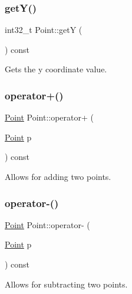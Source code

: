 \subsubsection{\texorpdfstring{getY()}{getY()}}
{\footnotesize\ttfamily int32\+\_\+t Point\+::getY (\begin{DoxyParamCaption}{ }\end{DoxyParamCaption}) const\hspace{0.3cm}{\ttfamily [inline]}}



Gets the y coordinate value. 

\mbox{\label{struct_point_a8629d3083ed756bbf84fbbd7f4b0781a}} 
\subsubsection{\texorpdfstring{operator+()}{operator+()}}
{\footnotesize\ttfamily \mbox{\hyperlink{struct_point}{Point}} Point\+::operator+ (\begin{DoxyParamCaption}\item[{\mbox{\hyperlink{struct_point}{Point}}}]{p }\end{DoxyParamCaption}) const\hspace{0.3cm}{\ttfamily [inline]}}



Allows for adding two points. 

\mbox{\label{struct_point_a21c4b2d6af14c97a276931a912413bef}} 
\subsubsection{\texorpdfstring{operator-\/()}{operator-()}}
{\footnotesize\ttfamily \mbox{\hyperlink{struct_point}{Point}} Point\+::operator-\/ (\begin{DoxyParamCaption}\item[{\mbox{\hyperlink{struct_point}{Point}}}]{p }\end{DoxyParamCaption}) const\hspace{0.3cm}{\ttfamily [inline]}}



Allows for subtracting two points. 

\mbox{\label{struct_point_a1921d1ddb2f6598197a1dbaaf02fa601}} 
